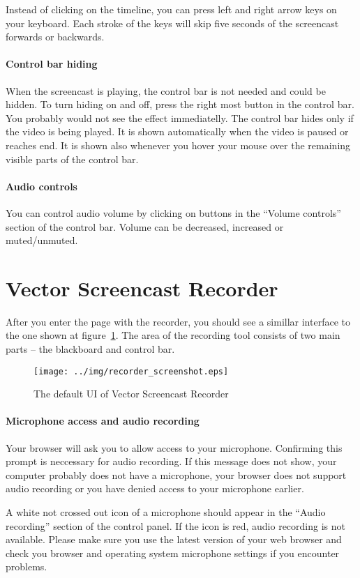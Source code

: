 Instead of clicking on the timeline, you can press left and right arrow keys on your keyboard. Each stroke of the keys will skip five seconds of the screencast forwards or backwards.

\paragraph{Control bar hiding}
When the screencast is playing, the control bar is not needed and could be hidden. To turn hiding on and off, press the right most button in the control bar. You probably would not see the effect immediatelly. The control bar hides only if the video is being played. It is shown automatically when the video is paused or reaches end. It is shown also whenever you hover your mouse over the remaining visible parts of the control bar.

\paragraph{Audio controls}
You can control audio volume by clicking on buttons in the ``Volume controls'' section of the control bar. Volume can be decreased, increased or muted/unmuted.


\section{Vector Screencast Recorder}
After you enter the page with the recorder, you should see a simillar interface to the one shown at figure~\ref{fig:recorder}. The area of the recording tool consists of two main parts -- the blackboard and control bar.

\begin{figure}
	\centering
		\texttt{[image: ../img/recorder\_screenshot.eps]}		
		\caption{The default UI of Vector Screencast Recorder\label{fig:recorder}}
\end{figure}

\paragraph{Microphone access and audio recording}
Your browser will ask you to allow access to your microphone. Confirming this prompt is neccessary for audio recording. If this message does not show, your computer probably does not have a microphone, your browser does not support audio recording or you have denied access to your microphone earlier. 

A white not crossed out icon of a microphone should appear in the ``Audio recording'' section of the control panel. If the icon is red, audio recording is not available. Please make sure you use the latest version of your web browser and check you browser and operating system microphone settings if you encounter problems.

